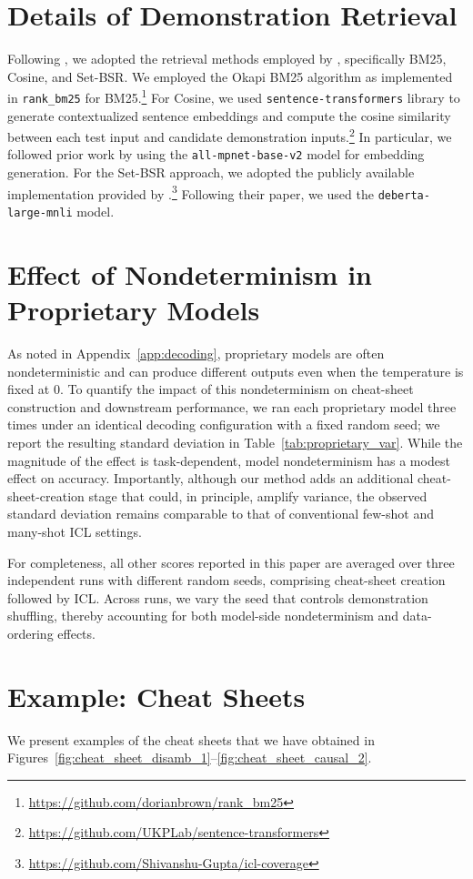 \documentclass[11pt]{article}
\begin{document}
\section{Details of Demonstration Retrieval}
\label{app:retrieval}
Following \citet{bertsch-etal-2025-context}, we adopted the retrieval methods employed by \citet{gupta-etal-2023-coverage}, specifically BM25, Cosine, and Set-BSR.
We employed the Okapi BM25 algorithm as implemented in \texttt{rank\_bm25} for BM25.\footnote{\url{https://github.com/dorianbrown/rank_bm25}}
For Cosine, we used \texttt{sentence-transformers} library \citep{reimers-gurevych-2019-sentence} to generate contextualized sentence embeddings and compute the cosine similarity between each test input and candidate demonstration inputs.\footnote{\url{https://github.com/UKPLab/sentence-transformers}}
In particular, we followed prior work by using the \texttt{all-mpnet-base-v2} model for embedding generation.
For the Set-BSR approach, we adopted the publicly available implementation provided by \citet{gupta-etal-2023-coverage}.\footnote{\url{https://github.com/Shivanshu-Gupta/icl-coverage}}
Following their paper, we used the \texttt{deberta-large-mnli} model.


\section{Effect of Nondeterminism in Proprietary Models}
\label{app:proprietary_var}
As noted in Appendix~\ref{app:decoding}, proprietary models are often nondeterministic and can produce different outputs even when the temperature is fixed at 0.
To quantify the impact of this nondeterminism on cheat-sheet construction and downstream performance, we ran each proprietary model three times under an identical decoding configuration with a fixed random seed; we report the resulting standard deviation in Table~\ref{tab:proprietary_var}.
While the magnitude of the effect is task-dependent, model nondeterminism has a modest effect on accuracy.
Importantly, although our method adds an additional cheat-sheet-creation stage that could, in principle, amplify variance, the observed standard deviation remains comparable to that of conventional few-shot and many-shot ICL settings.

For completeness, all other scores reported in this paper are averaged over three independent runs with different random seeds, comprising cheat-sheet creation followed by ICL.
Across runs, we vary the seed that controls demonstration shuffling, thereby accounting for both model-side nondeterminism and data-ordering effects.


\section{Example: Cheat Sheets}
\label{app:example_cheat}

We present examples of the cheat sheets that we have obtained in Figures~\ref{fig:cheat_sheet_disamb_1}--\ref{fig:cheat_sheet_causal_2}.







\end{document}
